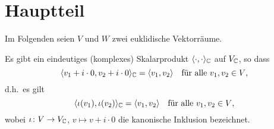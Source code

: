 \documentclass[a4paper,10pt]{article}
\begin{document}
\section{Hauptteil}


Im Folgenden seien $V$ und $W$ zwei euklidische Vektorräume.


\begin{proposition}
  Es gibt ein eindeutiges (komplexes) Skalarprodukt $\langle \cdot, \cdot \rangle_{\mathbb{C}}$ auf $V_{\mathbb{C}}$, so dass
  \[
      \langle v_1 + i \cdot 0, v_2 + i \cdot 0 \rangle_{\mathbb{C}}
    = \langle v_1, v_2 \rangle
    \quad
    \text{für alle $v_1, v_2 \in V$},
  \]
  d.h.\ es gilt
  \[
    \langle \iota(v_1), \iota(v_2) \rangle_{\mathbb{C}} = \langle v_1, v_2 \rangle
    \quad\text{für alle $v_1, v_2 \in V$},
  \]
  wobei $\iota \colon V \to V_{\mathbb{C}}$, $v \mapsto v + i \cdot 0$ die kanonische Inklusion bezeichnet.
\end{proposition}
\end{document}
